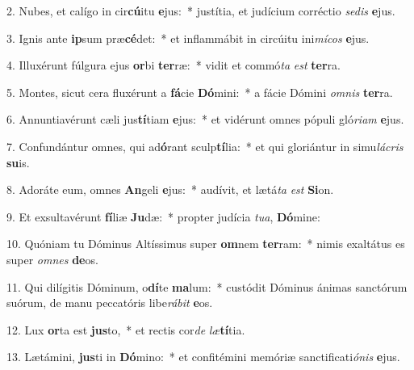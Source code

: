 2. Nubes, et calígo in cir\textbf{cú}itu \textbf{e}jus:~*  justítia, et judícium corréctio \textit{se}\textit{dis} \textbf{e}jus.\

3. Ignis ante \textbf{ip}sum præ\textbf{cé}det:~*  et inflammábit in circúitu ini\textit{mí}\textit{cos} \textbf{e}jus.\

4. Illuxérunt fúlgura ejus \textbf{or}bi \textbf{ter}ræ:~*  vidit et commó\textit{ta} \textit{est} \textbf{ter}ra.\

5. Montes, sicut cera fluxérunt a \textbf{fá}cie \textbf{Dó}mini:~*  a fácie Dómini \textit{om}\textit{nis} \textbf{ter}ra.\

6. Annuntiavérunt cæli jus\textbf{tí}tiam \textbf{e}jus:~*  et vidérunt omnes pópuli gló\textit{ri}\textit{am} \textbf{e}jus.\

7. Confundántur omnes, qui ad\textbf{ó}rant sculp\textbf{tí}lia:~*  et qui gloriántur in simu\textit{lá}\textit{cris} \textbf{su}is.\

8. Adoráte eum, omnes \textbf{An}geli \textbf{e}jus:~*  audívit, et lætá\textit{ta} \textit{est} \textbf{Si}on.\

9. Et exsultavérunt \textbf{fí}liæ \textbf{Ju}dæ:~*  propter judícia \textit{tu}\textit{a}, \textbf{Dó}mine:\

10. Quóniam tu Dóminus Altíssimus super \textbf{om}nem \textbf{ter}ram:~*  nimis exaltátus es super \textit{om}\textit{nes} \textbf{de}os.\

11. Qui dilígitis Dóminum, o\textbf{dí}te \textbf{ma}lum:~*  custódit Dóminus ánimas sanctórum suórum, de manu peccatóris libe\textit{rá}\textit{bit} \textbf{e}os.\

12. Lux \textbf{or}ta est \textbf{jus}to,~*  et rectis cor\textit{de} \textit{læ}\textbf{tí}tia.\

13. Lætámini, \textbf{jus}ti in \textbf{Dó}mino:~*  et confitémini memóriæ sanctificati\textit{ó}\textit{nis} \textbf{e}jus.\

